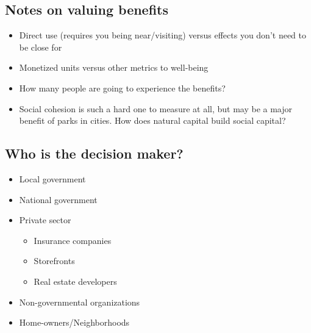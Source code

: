 \documentclass[12pt]{article}
\begin{document}
\vspace{1em}
\begin{center}
\begin{minipage}[t]{0.85\linewidth}
\small \noindent
\end{minipage}
\end{center}


\subsection*{Notes on valuing benefits}
\begin{itemize}
  \item Direct use (requires you being near/visiting) versus effects you don't need to be close for
  \item Monetized units versus other metrics to well-being
  \item How many people are going to experience the benefits?
  \item Social cohesion is such a hard one to measure at all, but may be a major benefit of parks in cities. How does natural capital build social capital? 
\end{itemize}

\subsection*{Who is the decision maker?}
\begin{itemize}
  \item Local government
  \item National government
  \item Private sector
  \begin{itemize}
    \item Insurance companies
    \item Storefronts 
    \item Real estate developers
  \end{itemize}
  \item Non-governmental organizations
  \item Home-owners/Neighborhoods 
\end{itemize}
\end{document}
